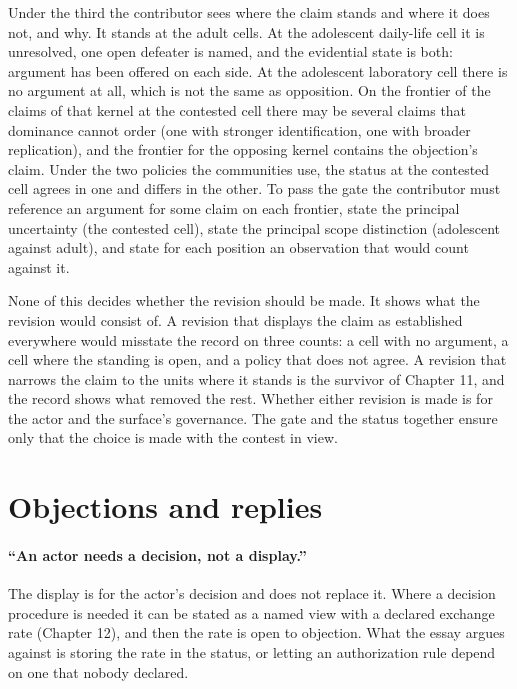 \documentclass[11pt]{article}
\begin{document}
Under the third the contributor sees where the claim stands and where it does not, and why. It stands at the adult cells. At the adolescent daily-life cell it is unresolved, one open defeater is named, and the evidential state is both: argument has been offered on each side. At the adolescent laboratory cell there is no argument at all, which is not the same as opposition. On the frontier of the claims of that kernel at the contested cell there may be several claims that dominance cannot order (one with stronger identification, one with broader replication), and the frontier for the opposing kernel contains the objection's claim. Under the two policies the communities use, the status at the contested cell agrees in one and differs in the other. To pass the gate the contributor must reference an argument for some claim on each frontier, state the principal uncertainty (the contested cell), state the principal scope distinction (adolescent against adult), and state for each position an observation that would count against it.

None of this decides whether the revision should be made. It shows what the revision would consist of. A revision that displays the claim as established everywhere would misstate the record on three counts: a cell with no argument, a cell where the standing is open, and a policy that does not agree. A revision that narrows the claim to the units where it stands is the survivor of Chapter 11, and the record shows what removed the rest. Whether either revision is made is for the actor and the surface's governance. The gate and the status together ensure only that the choice is made with the contest in view.

\section{Objections and replies}\label{sec:objections}

\paragraph{``An actor needs a decision, not a display.''} The display is for the actor's decision and does not replace it. Where a decision procedure is needed it can be stated as a named view with a declared exchange rate (Chapter 12), and then the rate is open to objection. What the essay argues against is storing the rate in the status, or letting an authorization rule depend on one that nobody declared.
\end{document}
